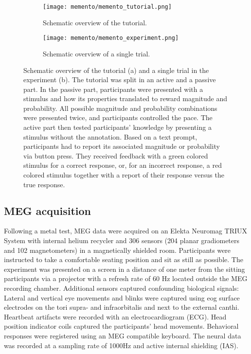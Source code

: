 \begin{figure}
	\begin{subfigure}{.54\textwidth}
	\texttt{[image: memento/memento\_tutorial.png]}
	\caption{Schematic overview of the tutorial.}
	\label{fig:memento_tutorial}
	\end{subfigure}
	\begin{subfigure}{.45\textwidth}
	\texttt{[image: memento/memento\_experiment.png]}
	\caption{Schematic overview of a single trial.}
	\label{fig:memento_trial}
\end{subfigure}
	\caption[Memento: Tutorial and trial overview]{Schematic overview of the tutorial (a) and a single trial in the experiment (b).
	The tutorial was split in an active and a passive part.
	In the passive part, participants were presented with a stimulus and how its properties translated to reward magnitude and probability. All possible magnitude and probability combinations were presented twice, and participants controlled the pace. The active part then tested participants' knowledge by presenting a stimulus without the annotation. Based on a text prompt, participants had to report its associated magnitude or probability via button press. They received feedback with a green colored stimulus for a correct response, or, for an incorrect response, a red colored stimulus together with a report of their response versus the true response.
	}
\label{fig:memento}
\end{figure}


\subsection{MEG acquisition}

Following a metal test, MEG data were acquired on an Elekta Neuromag TRIUX System with internal helium recycler and 306 sensors (204 planar gradiometers and 102 magnetometers) in a magnetically shielded room.
Participants were instructed to take a comfortable seating position and sit as still as possible.
The experiment was presented on a screen in a distance of one meter from the sitting participants via a projector with a refresh rate of 60 Hz located outside the MEG recording chamber.
Additional sensors captured confounding biological signals:
Lateral and vertical eye movements and blinks were captured using \gls{eog} surface electrodes on the tori supra- and infraorbitalis and next to the external canthi.
Heartbeat artifacts were recorded with an electrocardiogram (ECG).
Head position indicator coils captured the participants' head movements.
Behavioral responses were registered using an MEG compatible keyboard.
The neural data was recorded at a sampling rate of 1000Hz and active internal shielding (IAS).


